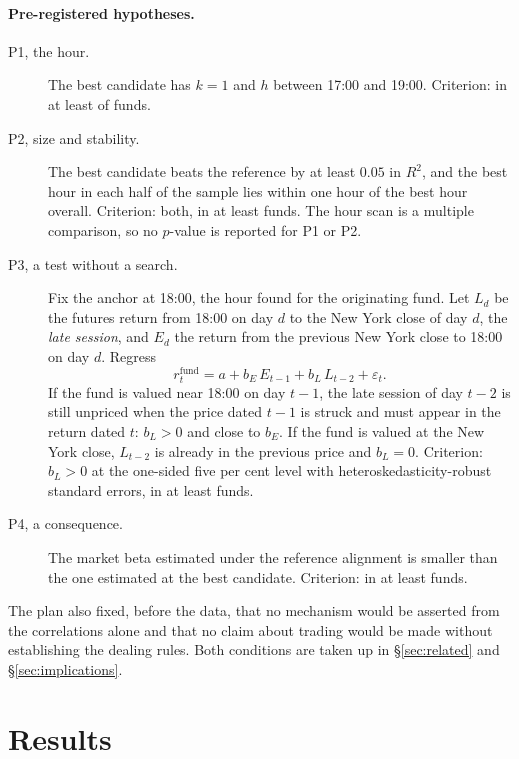 \documentclass[11pt,a4paper]{article}
\begin{document}
\paragraph{Pre-registered hypotheses.}
\begin{description}
  \item[P1, the hour.] The best candidate has $k=1$ and $h$ between 17:00 and
  19:00. Criterion: in at least \PoneNeed{} of \NFunds{} funds.
  \item[P2, size and stability.] The best candidate beats the reference by at
  least $0.05$ in $R^{2}$, and the best hour in each half of the sample lies
  within one hour of the best hour overall. Criterion: both, in at least
  \PtwoNeed{} funds. The hour scan is a multiple comparison, so no $p$-value is
  reported for P1 or P2.
  \item[P3, a test without a search.] Fix the anchor at 18:00, the hour found
  for the originating fund. Let $L_{d}$ be the futures return from 18:00 on day
  $d$ to the New York close of day $d$, the \emph{late session}, and $E_{d}$
  the return from the previous New York close to 18:00 on day $d$. Regress
  \[
    r^{\text{fund}}_{t} = a + b_{E}\,E_{t-1} + b_{L}\,L_{t-2} + \varepsilon_{t}.
  \]
  If the fund is valued near 18:00 on day $t-1$, the late session of day $t-2$
  is still unpriced when the price dated $t-1$ is struck and must appear in the
  return dated $t$: $b_{L}>0$ and close to $b_{E}$. If the fund is valued at
  the New York close, $L_{t-2}$ is already in the previous price and
  $b_{L}=0$. Criterion: $b_{L}>0$ at the one-sided five per cent level with
  heteroskedasticity-robust standard errors, in at least \PthreeNeed{} funds.
  \item[P4, a consequence.] The market beta estimated under the reference
  alignment is smaller than the one estimated at the best candidate.
  Criterion: in at least \PfourNeed{} funds.
\end{description}

The plan also fixed, before the data, that no mechanism would be asserted from
the correlations alone and that no claim about trading would be made without
establishing the dealing rules. Both conditions are taken up in
\S\ref{sec:related} and \S\ref{sec:implications}.

\section{Results}\label{sec:results}
\end{document}
